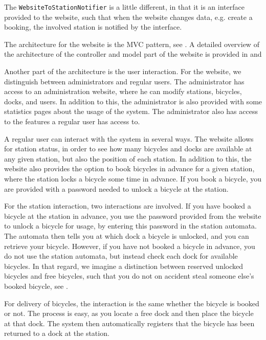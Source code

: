 The \texttt{WebsiteToStationNotifier} is a little different, in that it is an interface provided to the website, such that when the website changes data, e.g. create a booking, the involved station is notified by the interface.

The architecture for the website is the MVC pattern, see .
A detailed overview of the architecture of the controller and model part of the website is provided in  and 

Another part of the architecture is the user interaction.
For the website, we distinguish between administrators and regular users.
The administrator has access to an administration website, where he can modify stations, bicycles, docks, and users.
In addition to this, the administrator is also provided with some statistics pages about the usage of the system.
The administrator also has access to the features a regular user has access to.

A regular user can interact with the system in several ways.
The website allows for station status, in order to see how many bicycles and docks are available at any given station, but also the position of each station.
In addition to this, the website also provides the option to book bicycles in advance for a given station, where the station locks a bicycle some time in advance.
If you book a bicycle, you are provided with a password needed to unlock a bicycle at the station.

For the station interaction, two interactions are involved.
If you have booked a bicycle at the station in advance, you use the password provided from the website to unlock a bicycle for usage, by entering this password in the station automata.
The automata then tells you at which dock a bicycle is unlocked, and you can retrieve your bicycle.
However, if you have not booked a bicycle in advance, you do not use the station automata, but instead check each dock for available bicycles.
In that regard, we imagine a distinction between reserved unlocked bicycles and free bicycles, such that you do not on accident steal someone else's booked bicycle, see .

For delivery of bicycles, the interaction is the same whether the bicycle is booked or not.
The process is easy, as you locate a free dock and then place the bicycle at that dock.
The system then automatically registers that the bicycle has been returned to a dock at the station.


